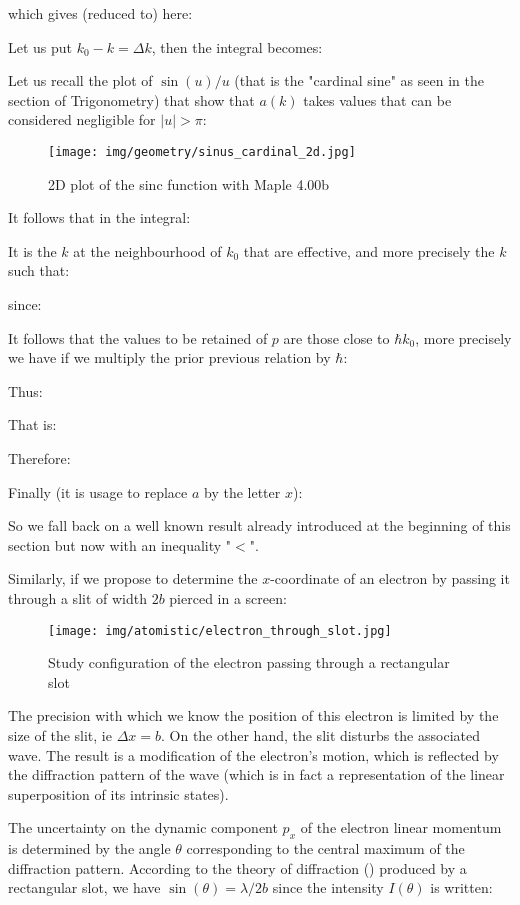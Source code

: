 	which gives (reduced to) here:
	
	Let us put $k_0-k=\Delta k$, then the integral becomes:
	
	Let us recall the plot of $\sin(u)/u$ (that is the "cardinal sine" as seen in the section of Trigonometry) that show that $a(k)$ takes values that can be considered negligible for $|u|>\pi$:
	\begin{figure}[H]
		\centering
		\texttt{[image: img/geometry/sinus\_cardinal\_2d.jpg]}
		\caption{2D plot of the sinc function with Maple 4.00b}
	\end{figure}
	It follows that in the integral:
	
	It is the $k$ at the neighbourhood of $k_0$ that are effective, and more precisely the $k$ such that:
	
	since:
	
	It follows that the values to be retained of $p$ are those close to $\hbar k_0$, more precisely we have if we multiply the prior previous relation by $\hbar$:
	
	Thus:
	
	That is:
	
	Therefore:
	
	Finally (it is usage to replace $a$ by the letter $x$):
	
	So we fall back on a well known result already introduced at the beginning of this section but now with an inequality "$<$".
	
	Similarly, if we propose to determine the $x$-coordinate of an electron by passing it through a slit of width $2b$ pierced in a screen:
	\begin{figure}[H]
		\centering
		\texttt{[image: img/atomistic/electron\_through\_slot.jpg]}
		\caption[]{Study configuration of the electron passing through a rectangular slot}
	\end{figure}
	The precision with which we know the position of this electron is limited by the size of the slit, ie $\Delta x=b$. On the other hand, the slit disturbs the associated wave. The result is a modification of the electron's motion, which is reflected by the diffraction pattern of the wave (which is in fact a representation of the linear superposition of its intrinsic states).

	The uncertainty on the dynamic component $p_x$ of the electron linear momentum is determined by the angle $\theta$ corresponding to the central maximum of the diffraction pattern. According to the theory of diffraction () produced by a rectangular slot, we have $\sin(\theta)=\lambda/2b$ since the intensity $I(\theta)$ is written:
	
